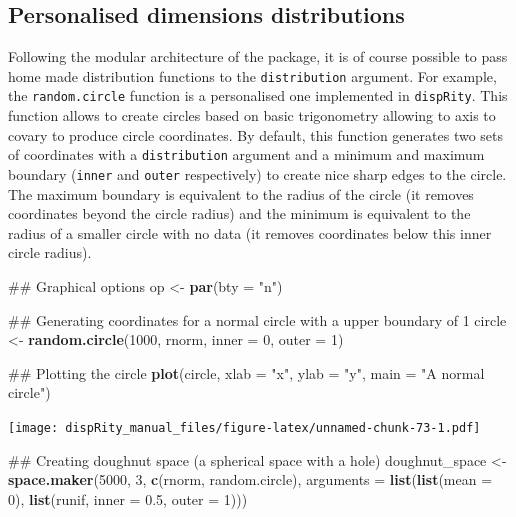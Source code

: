 \documentclass[]{book}
\newenvironment{Shaded}{\begin{snugshade}}{\end{snugshade}}
\newcommand{\KeywordTok}[1]{\textcolor[rgb]{0.13,0.29,0.53}{\textbf{#1}}}
\newcommand{\DataTypeTok}[1]{\textcolor[rgb]{0.13,0.29,0.53}{#1}}
\newcommand{\DecValTok}[1]{\textcolor[rgb]{0.00,0.00,0.81}{#1}}
\newcommand{\FloatTok}[1]{\textcolor[rgb]{0.00,0.00,0.81}{#1}}
\newcommand{\StringTok}[1]{\textcolor[rgb]{0.31,0.60,0.02}{#1}}
\newcommand{\NormalTok}[1]{#1}
\theoremstyle{definition}
\theoremstyle{definition}
\theoremstyle{remark}
\begin{document}
\subsection{Personalised dimensions
distributions}\label{personalised-dimensions-distributions}

Following the modular architecture of the package, it is of course
possible to pass home made distribution functions to the
\texttt{distribution} argument. For example, the \texttt{random.circle}
function is a personalised one implemented in \texttt{dispRity}. This
function allows to create circles based on basic trigonometry allowing
to axis to covary to produce circle coordinates. By default, this
function generates two sets of coordinates with a \texttt{distribution}
argument and a minimum and maximum boundary (\texttt{inner} and
\texttt{outer} respectively) to create nice sharp edges to the circle.
The maximum boundary is equivalent to the radius of the circle (it
removes coordinates beyond the circle radius) and the minimum is
equivalent to the radius of a smaller circle with no data (it removes
coordinates below this inner circle radius).

\begin{Shaded}
\begin{Highlighting}[]
\NormalTok{## Graphical options}
\NormalTok{op <-}\StringTok{ }\KeywordTok{par}\NormalTok{(}\DataTypeTok{bty =} \StringTok{"n"}\NormalTok{)}

\NormalTok{## Generating coordinates for a normal circle with a upper boundary of 1}
\NormalTok{circle <-}\StringTok{ }\KeywordTok{random.circle}\NormalTok{(}\DecValTok{1000}\NormalTok{, rnorm, }\DataTypeTok{inner =} \DecValTok{0}\NormalTok{, }\DataTypeTok{outer =} \DecValTok{1}\NormalTok{)}

\NormalTok{## Plotting the circle}
\KeywordTok{plot}\NormalTok{(circle, }\DataTypeTok{xlab =} \StringTok{"x"}\NormalTok{, }\DataTypeTok{ylab =} \StringTok{"y"}\NormalTok{, }\DataTypeTok{main =} \StringTok{"A normal circle"}\NormalTok{)}
\end{Highlighting}
\end{Shaded}

\texttt{[image: dispRity\_manual\_files/figure-latex/unnamed-chunk-73-1.pdf]}

\begin{Shaded}
\begin{Highlighting}[]
\NormalTok{## Creating doughnut space (a spherical space with a hole)}
\NormalTok{doughnut_space <-}\StringTok{ }\KeywordTok{space.maker}\NormalTok{(}\DecValTok{5000}\NormalTok{, }\DecValTok{3}\NormalTok{, }\KeywordTok{c}\NormalTok{(rnorm, random.circle),}
     \DataTypeTok{arguments =} \KeywordTok{list}\NormalTok{(}\KeywordTok{list}\NormalTok{(}\DataTypeTok{mean =} \DecValTok{0}\NormalTok{), }\KeywordTok{list}\NormalTok{(runif, }\DataTypeTok{inner =} \FloatTok{0.5}\NormalTok{, }\DataTypeTok{outer =} \DecValTok{1}\NormalTok{)))}
\end{Highlighting}
\end{Shaded}
\end{document}
